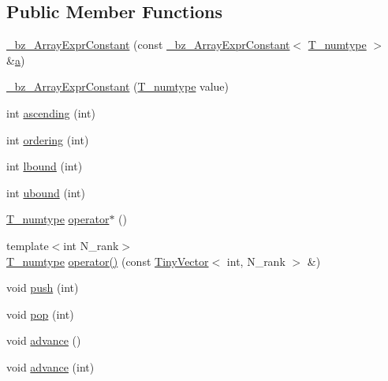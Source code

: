 \subsection*{Public Member Functions}
\begin{DoxyCompactItemize}
\item 
\hyperlink{class__bz__ArrayExprConstant_a7f4e3f01e20570ca0a18419b260234e3}{\+\_\+bz\+\_\+\+Array\+Expr\+Constant} (const \hyperlink{class__bz__ArrayExprConstant}{\+\_\+bz\+\_\+\+Array\+Expr\+Constant}$<$ \hyperlink{class__bz__ArrayExprConstant_a7a9b5e4fa964d73b7f8b31e7977123cb}{T\+\_\+numtype} $>$ \&\hyperlink{gen__mat5files_8m_aae328bf20413f220e38aec4d95bfd6da}{a})
\item 
\hyperlink{class__bz__ArrayExprConstant_ae723ab321b9d184a9582523cfa906aae}{\+\_\+bz\+\_\+\+Array\+Expr\+Constant} (\hyperlink{class__bz__ArrayExprConstant_a7a9b5e4fa964d73b7f8b31e7977123cb}{T\+\_\+numtype} value)
\item 
int \hyperlink{class__bz__ArrayExprConstant_acdcb82c23b5287de6b0690febc5c7c71}{ascending} (int)
\item 
int \hyperlink{class__bz__ArrayExprConstant_a8e417c244eef14a8ef7a1ef70471c04b}{ordering} (int)
\item 
int \hyperlink{class__bz__ArrayExprConstant_a5be31ccfa58dba8735ef4530b6d9f2d0}{lbound} (int)
\item 
int \hyperlink{class__bz__ArrayExprConstant_a480631e09ce24cd9813529f3bb955211}{ubound} (int)
\item 
\hyperlink{class__bz__ArrayExprConstant_a7a9b5e4fa964d73b7f8b31e7977123cb}{T\+\_\+numtype} \hyperlink{class__bz__ArrayExprConstant_a53167b6385537fd467d6c9a6887baa0f}{operator$\ast$} ()
\item 
{\footnotesize template$<$int N\+\_\+rank$>$ }\\\hyperlink{class__bz__ArrayExprConstant_a7a9b5e4fa964d73b7f8b31e7977123cb}{T\+\_\+numtype} \hyperlink{class__bz__ArrayExprConstant_ad8d099b0f32ca1c7e3d2092a63cb76da}{operator()} (const \hyperlink{classTinyVector}{Tiny\+Vector}$<$ int, N\+\_\+rank $>$ \&)
\item 
void \hyperlink{class__bz__ArrayExprConstant_acd55fc0a4aeb1b6c4b318112bbda0fe3}{push} (int)
\item 
void \hyperlink{class__bz__ArrayExprConstant_a155cd0fb7cb49a4b6e252eaaab642f3a}{pop} (int)
\item 
void \hyperlink{class__bz__ArrayExprConstant_a15a62d65d1dc4bf142dcdbe02c03bd4c}{advance} ()
\item 
void \hyperlink{class__bz__ArrayExprConstant_a9391e18b5d8e772ce0ee5a9980ee432c}{advance} (int)

\end{DoxyCompactItemize}
